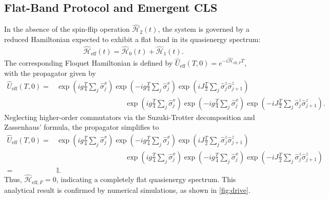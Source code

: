\documentclass[a4paper, 10pt]{article}
\begin{document}
\subsection{Flat-Band Protocol and Emergent CLS}
In the absence of the spin-flip operation $\hat{\mathcal{H}}_2(t)$, the system is governed by a reduced Hamiltonian expected to exhibit a flat band in its quasienergy spectrum:
\begin{align}
    \hat{\mathcal{H}}_{\text{eff}}(t) = \hat{\mathcal{H}}_0(t) + \hat{\mathcal{H}}_1(t).
\end{align}
The corresponding Floquet Hamiltonian is defined by $\hat{U}_{\text{eff}}(T,0) = e^{-i \hat{\mathcal{H}}_{\text{eff},F} T}$, with the propagator given by
\begin{align}
    \hat{U}_{\text{eff}}(T,0) =& 
    \exp\left(i g \frac{T}{4} \sum_{j}\hat{\sigma}_j^x\right)
    \exp\left(-i g \frac{T}{4} \sum_{j}\hat{\sigma}_j^x\right)\exp\left(i J \frac{T}{2} \sum_{j} \hat{\sigma}_j^z \hat{\sigma}_{j+1}^z\right)\nonumber\\
    &\hspace{4cm}\exp\left(i g \frac{T}{4} \sum_{j}\hat{\sigma}_j^x\right)\exp\left(-i g \frac{T}{4} \sum_{j}\hat{\sigma}_j^x\right)\exp\left(-i J \frac{T}{2} \sum_{j} \hat{\sigma}_j^z \hat{\sigma}_{j+1}^z\right).
\end{align}
Neglecting higher-order commutators via the Suzuki-Trotter decomposition and Zassenhaus’ formula, the propagator simplifies to
\begin{align}
    \hat{U}_{\text{eff}}(T,0) =& 
        \exp\left(i g \frac{T}{4} \sum_{j}\hat{\sigma}_j^x\right)
        \exp\left(-i g \frac{T}{4} \sum_{j}\hat{\sigma}_j^x\right)\exp\left(i J \frac{T}{2} \sum_{j} \hat{\sigma}_j^z \hat{\sigma}_{j+1}^z\right)\nonumber\\
        &\hspace{4cm}\exp\left(i g \frac{T}{4} \sum_{j}\hat{\sigma}_j^x\right)\exp\left(-i g \frac{T}{4} \sum_{j}\hat{\sigma}_j^x\right)\exp\left(-i J \frac{T}{2} \sum_{j} \hat{\sigma}_j^z \hat{\sigma}_{j+1}^z\right)\nonumber\\
        =& \mathbb{I}.
\end{align}
Thus, $\hat{\mathcal{H}}_{\text{eff},F} = 0$, indicating a completely flat quasienergy spectrum. This analytical result is confirmed by numerical simulations, as shown in \cref{fig:drive}.
\end{document}
